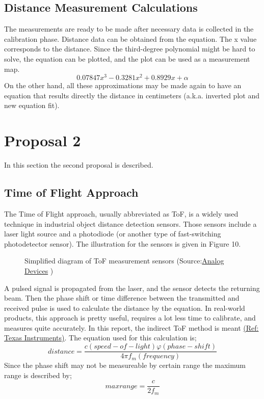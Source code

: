 \documentclass[letterpaper,12pt]{article}
\begin{document}
\subsection{Distance Measurement Calculations}
The measurements are ready to be made after necessary data is collected in the calibration phase. Distance data can be obtained from the equation. The x value corresponds to the distance. Since the third-degree polynomial might be hard to solve, the equation can be plotted, and the plot can be used as a measurement map.%
\[0.07847 x^3 -0.3281 x^2 + 0.8929x + \alpha\]
On the other hand, all these approximations may be made again to have an equation that results directly the distance in centimeters (a.k.a. inverted plot and new equation fit).  



\section{Proposal 2}
In this section the second proposal is described.
\subsection{Time of Flight Approach}
The Time of Flight approach, usually abbreviated as ToF, is a widely used technique in industrial object distance detection sensors. Those sensors include a laser light source and a photodiode (or another type of fast-switching photodetector sensor). The illustration for the sensors is given in Figure 10.
\begin{figure}[H] 
	\caption{Simplified diagram of ToF measurement sensors (Source:\hyperref[sec:ref]{Analog Devices} )}
\end{figure}
A pulsed signal is propagated from the laser, and the sensor detects the returning beam. Then the phase shift or time difference between the transmitted and received pulse is used to calculate the distance by the equation.
In real-world products, this approach is pretty useful, requires a lot less time to calibrate, and measures quite accurately. In this report, the indirect ToF method is meant \hyperref[sec:ref]{(Ref: Texas Instruments)}. The equation used for this calculation is; 
\[distance = \frac{  c(speed-of-light)  \varphi (phase-shift)  }{4 \pi f_m (frequency)}\]
Since the phase shift may not be measureable by certain range the maximum range is described by;
\[maxrange = \frac{c}{2 f_m}\]
\end{document}
